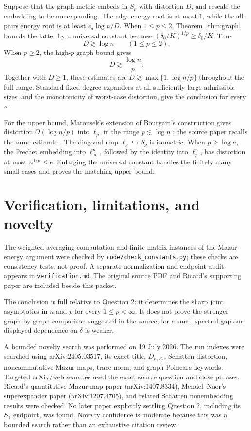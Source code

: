 \documentclass[11pt]{article}
\begin{document}
Suppose that the graph metric embeds in $S_p$ with distortion $D$, and
rescale the embedding to be nonexpanding.  The edge-energy root is at most
$1$, while the all-pairs energy root is at least $c_d\log n/D$.  When
$1\le p\le2$, Theorem~\ref{thm:graph} bounds the latter by a universal
constant because $(\delta_0/K)^{1/p}\ge\delta_0/K$.  Thus
\[
 D\gtrsim\log n\qquad(1\le p\le2).
\]
When $p\ge2$, the high-$p$ graph bound gives
\[
 D\gtrsim\frac{\log n}{p}.
\]
Together with $D\ge1$, these estimates are
$D\gtrsim\max\{1,\log n/p\}$ throughout the full range.  Standard
fixed-degree expanders at all sufficiently large admissible sizes, and the
monotonicity of worst-case distortion, give the conclusion for every $n$.

For the upper bound, Matousek's extension of Bourgain's construction gives
distortion $O(\log n/p)$ into $\ell_p$ in the range $p\lesssim\log n$
\cite{matousek}; the source paper recalls the same estimate \cite{source}.
The diagonal map $\ell_p\hookrightarrow S_p$ is isometric.  When
$p\ge\log n$, the Frechet embedding into $\ell_\infty^n$, followed by
the identity into $\ell_p^n$, has distortion at most
$n^{1/p}\le e$.  Enlarging the universal constant handles the finitely
many small cases and proves the matching upper bound.

\section{Verification, limitations, and novelty}

The weighted averaging computation and finite matrix instances of the
Mazur-energy argument were checked by
\texttt{code/check\_constants.py}; these checks are consistency tests, not
proof.  A separate normalization and endpoint audit appears in
\texttt{verification.md}.  The original source PDF and Ricard's supporting
paper are included beside this packet.

The conclusion is full relative to Question 2: it determines the sharp
joint asymptotics in $n$ and $p$ for every $1\le p<\infty$.  It does
not prove the stronger graph-by-graph comparison suggested in the source;
for a small spectral gap our displayed dependence on $\delta$ is weaker.

A bounded novelty search was performed on 19 July 2026.  The run indexes
were searched using arXiv:2405.03517, its exact title, $D_{n,S_p}$,
Schatten distortion, noncommutative Mazur maps, trace norm, and graph
Poincare keywords.  Targeted arXiv/web searches used the exact source
question and close phrases.  Ricard's quantitative Mazur-map paper
(arXiv:1407.8334), Mendel--Naor's superexpander paper (arXiv:1207.4705),
and related Schatten nonembedding results were checked.  No later paper
explicitly settling Question 2, including its $S_1$ endpoint, was found.
Novelty confidence is moderate because this was a bounded search rather
than an exhaustive citation review.
\end{document}

